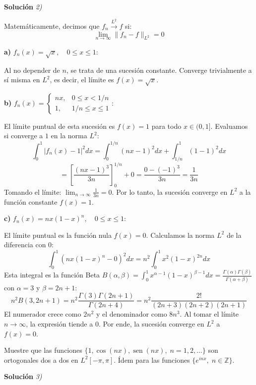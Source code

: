 \documentclass[11pt,spanish]{article}
\newcounter{problema}
\newcommand{\prob}{\stepcounter{problema} \vspace{.5cm} \noindent{\bf Problema \arabic{problema}: }}
\begin{document}
\vspace{0.5cm}
{\bf Soluci\'on }{\em 2)}
\vspace{0.5cm}

Matemáticamente, decimos que $f_n \xrightarrow{L^2} f$ si:
$$\lim_{n \to \infty} \|f_n - f\|_{L^2} = 0$$

{\bf a)} $f_n(x) = \sqrt{x}, \quad 0 \le x \le 1$:

Al no depender de $n$, se trata de una sucesión constante. Converge trivialmente a sí misma en $L^2$, es decir, el límite es $f(x) = \sqrt{x}$.

\vspace{0.5cm}
{\bf b)} $f_n(x) = \begin{cases} nx, & 0 \le x < 1/n \\ 1, & 1/n \le x \le 1 \end{cases}$:

El límite puntual de esta sucesión es $f(x) = 1$ para todo $x \in (0, 1]$. Evaluamos si converge a $1$ en la norma $L^2$:
$$\int_0^1 |f_n(x) - 1|^2 dx = \int_0^{1/n} (nx - 1)^2 dx + \int_{1/n}^1 (1 - 1)^2 dx$$
$$= \left[ \frac{(nx - 1)^3}{3n} \right]_0^{1/n} + 0 = \frac{0 - (-1)^3}{3n} = \frac{1}{3n}$$
Tomando el límite: $\lim_{n \to \infty} \frac{1}{3n} = 0$. Por lo tanto, la sucesión converge en $L^2$ a la función constante $f(x) = 1$.

\vspace{0.5cm}
{\bf c)} $f_n(x) = nx(1-x)^n, \quad 0 \le x \le 1$:

El límite puntual es la función nula $f(x) = 0$. Calculamos la norma $L^2$ de la diferencia con $0$:
$$\int_0^1 (nx(1-x)^n - 0)^2 dx = n^2 \int_0^1 x^2 (1-x)^{2n} dx$$
Esta integral es la función Beta $B(\alpha, \beta) = \int_0^1 x^{\alpha-1}(1-x)^{\beta-1} dx = \frac{\Gamma(\alpha)\Gamma(\beta)}{\Gamma(\alpha+\beta)}$ con $\alpha=3$ y $\beta=2n+1$:
$$n^2 B(3, 2n+1) = n^2 \frac{\Gamma(3)\Gamma(2n+1)}{\Gamma(2n+4)} = n^2 \frac{2!}{(2n+3)(2n+2)(2n+1)}$$
El numerador crece como $2n^2$ y el denominador como $8n^3$. Al tomar el límite $n \to \infty$, la expresión tiende a $0$. Por ende, la sucesión converge en $L^2$ a $f(x) = 0$.


\prob Muestre que las funciones $\{1, \cos(nx), \operatorname{sen}(nx),\; n=1,2,\dots\}$ son ortogonales dos a dos en $L^2[-\pi,\pi]$. Ídem para las funciones $\{e^{inx},\; n\in\mathbb{Z}\}$.

\vspace{0.5cm}
{\bf Soluci\'on }{\em 3)}
\vspace{0.5cm}
\end{document}
